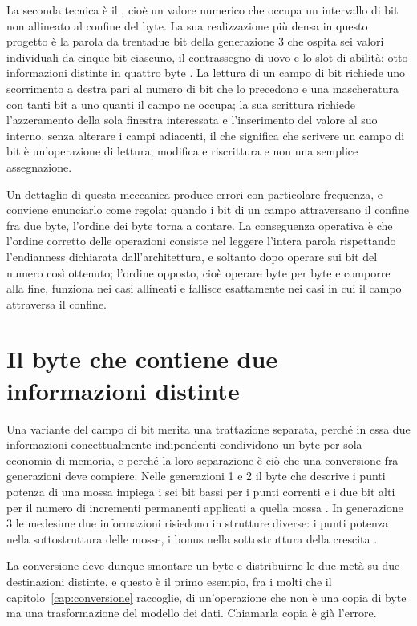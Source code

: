 La seconda tecnica è il , cioè un valore numerico che occupa un intervallo di bit non allineato al confine del byte. La sua realizzazione più densa in questo progetto è la parola da trentadue bit della generazione 3 che ospita sei valori individuali da cinque bit ciascuno, il contrassegno di uovo e lo slot di abilità: otto informazioni distinte in quattro byte \cite{pokeemerald}. La lettura di un campo di bit richiede uno scorrimento a destra pari al numero di bit che lo precedono e una mascheratura con tanti bit a uno quanti il campo ne occupa; la sua scrittura richiede l'azzeramento della sola finestra interessata e l'inserimento del valore al suo interno, senza alterare i campi adiacenti, il che significa che scrivere un campo di bit è un'operazione di lettura, modifica e riscrittura e non una semplice assegnazione.

Un dettaglio di questa meccanica produce errori con particolare frequenza, e conviene enunciarlo come regola: quando i bit di un campo attraversano il confine fra due byte, l'ordine dei byte torna a contare. La conseguenza operativa è che l'ordine corretto delle operazioni consiste nel leggere l'intera parola rispettando l'endianness dichiarata dall'architettura, e soltanto dopo operare sui bit del numero così ottenuto; l'ordine opposto, cioè operare byte per byte e comporre alla fine, funziona nei casi allineati e fallisce esattamente nei casi in cui il campo attraversa il confine.

\section{Il byte che contiene due informazioni distinte}

Una variante del campo di bit merita una trattazione separata, perché in essa due informazioni concettualmente indipendenti condividono un byte per sola economia di memoria, e perché la loro separazione è ciò che una conversione fra generazioni deve compiere. Nelle generazioni 1 e 2 il byte che descrive i punti potenza di una mossa impiega i sei bit bassi per i punti correnti e i due bit alti per il numero di incrementi permanenti applicati a quella mossa \cite{pokered}. In generazione 3 le medesime due informazioni risiedono in strutture diverse: i punti potenza nella sottostruttura delle mosse, i bonus nella sottostruttura della crescita \cite{pokeemerald}.

La conversione deve dunque smontare un byte e distribuirne le due metà su due destinazioni distinte, e questo è il primo esempio, fra i molti che il capitolo~\ref{cap:conversione} raccoglie, di un'operazione che non è una copia di byte ma una trasformazione del modello dei dati. Chiamarla copia è già l'errore.

